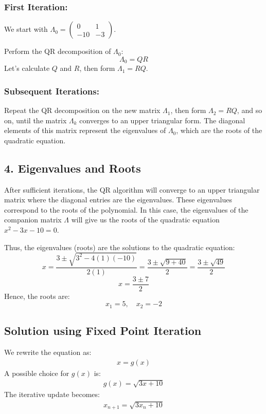 \documentclass[journal]{IEEEtran}
\begin{document}
\subsubsection*{First Iteration:}
We start with \( \Lambda_0 = \begin{pmatrix} 0 & 1 \\ -10 & -3 \end{pmatrix} \).

Perform the QR decomposition of \( \Lambda_0 \):
\[
\Lambda_0 = QR
\]
Let’s calculate \( Q \) and \( R \), then form \( \Lambda_1 = RQ \).

\subsubsection*{Subsequent Iterations:}
Repeat the QR decomposition on the new matrix \( \Lambda_1 \), then form \( \Lambda_2 = RQ \), and so on, until the matrix \( \Lambda_k \) converges to an upper triangular form. The diagonal elements of this matrix represent the eigenvalues of \( \Lambda_0 \), which are the roots of the quadratic equation.

\subsection*{4. Eigenvalues and Roots}
After sufficient iterations, the QR algorithm will converge to an upper triangular matrix where the diagonal entries are the eigenvalues. These eigenvalues correspond to the roots of the polynomial. In this case, the eigenvalues of the companion matrix \( \Lambda \) will give us the roots of the quadratic equation \( x^2 - 3x - 10 = 0 \).

Thus, the eigenvalues (roots) are the solutions to the quadratic equation:
\[
x = \frac{3 \pm \sqrt{3^2 - 4(1)(-10)}}{2(1)} = \frac{3 \pm \sqrt{9 + 40}}{2} = \frac{3 \pm \sqrt{49}}{2}
\]
\[
x = \frac{3 \pm 7}{2}
\]
Hence, the roots are:
\[
x_1 = 5, \quad x_2 = -2
\]

\subsection*{ Solution using Fixed Point Iteration}
We rewrite the equation as:
\begin{align}
    x = g(x)
\end{align}
A possible choice for \( g(x) \) is:
\begin{align}
    g(x) = \sqrt{3x + 10}
\end{align}
The iterative update becomes:
\begin{align}
    x_{n+1} = \sqrt{3x_n + 10}
\end{align}
\end{document}

